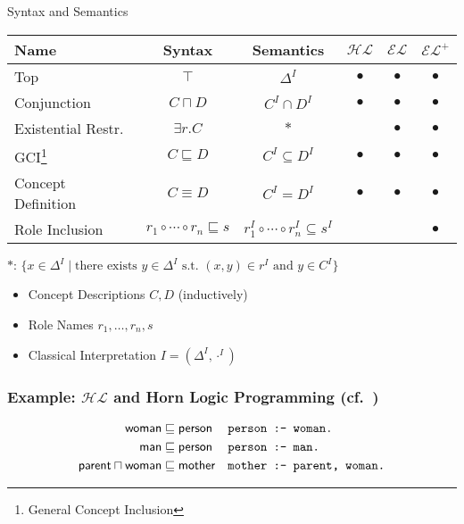 \documentclass[xcolor={table,usenames,dvipsnames}]{beamer}
\newcommand{\elp}{\ensuremath{\mathcal{EL^+}}\xspace}
\newcommand{\el}{\ensuremath{\mathcal{EL}}\xspace}
\newcommand{\hl}{\ensuremath{\mathcal{HL}}\xspace}
\newcommand{\subsume}{\sqsubseteq}
\begin{document}
\begin{frame}{Syntax and Semantics \cite[Sec.~2, Tbl.~1]{orig2}}

{\small
{}
\setlength\tabcolsep{3pt}
\begin{tabular}{|l|cc|ccc|}
\hline
Name & Syntax & Semantics &\hl &\el & \elp \\
\hline
\hline
Top & $\top$ & $\Delta^I$ & $\bullet$ & $\bullet$ & $\bullet$ \\
Conjunction & $ C \sqcap D $ & $C^I \cap D^I$ & $\bullet$ & $\bullet$ & $\bullet$ \\
Existential Restr.~& $ \exists r . C $ & $\ast$ & & $\bullet$ & $\bullet$ \\
\hline
\hline
GCI\footnote{General Concept Inclusion} & $C \sqsubseteq D$ & $C^I \subseteq D^I$ & $\bullet$ & $\bullet$ & $\bullet$ \\
Concept Definition & $C \equiv D$ & $C^I = D^I$ & $\bullet$ & $\bullet$ & $\bullet$ \\
Role Inclusion & $r_1 \circ \cdots \circ r_n \sqsubseteq s$ & $r_1^I \circ \cdots \circ r_n^I \subseteq s^I$ & & & $\bullet$ \\
\hline
\end{tabular}}

$\text{$\ast$: } \{x \in \Delta^I \mid \text{there exists } y \in \Delta^I \text{ s.t.~} (x, y) \in r^I \text{ and } y \in C^I \}$
\begin{itemize}
\item{Concept Descriptions $C, D$ (inductively)}
\item{Role Names $r_1, \ldots, r_n, s$}
\item{Classical Interpretation $I = (\Delta^I, \cdot^I)$}
\end{itemize}

\end{frame}

\begin{frame}
\frametitle{Example: \hl and Horn Logic Programming (cf.~\cite[Sec.~2]{orig2})}

\begin{align*}
	\mathsf{woman} &\subsume \mathsf{person} & \text{\texttt{person :- }}&\text{\texttt{woman.}}\\
	\mathsf{man} &\subsume \mathsf{person} & \text{\texttt{person :- }}&\text{\texttt{man.}}\\
	\mathsf{parent} \sqcap \mathsf{woman} &\subsume \mathsf{mother} & \text{\texttt{mother :- }}&\text{\texttt{parent, woman.}}
\end{align*}

\end{frame}
\end{document}
